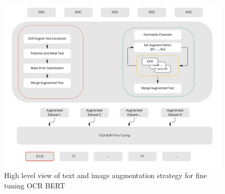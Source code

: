 \documentclass{article}
\begin{document}
    \graphicspath{{Images/}}
    	\begin{figure}[htp]
    		\centering
    		\includegraphics[scale=.25]{arch}
    		\caption{High level view of text and image augmentation strategy for fine tuning OCR BERT}
    		\label{fig:arch}
    	\end{figure}
	
\end{document}

